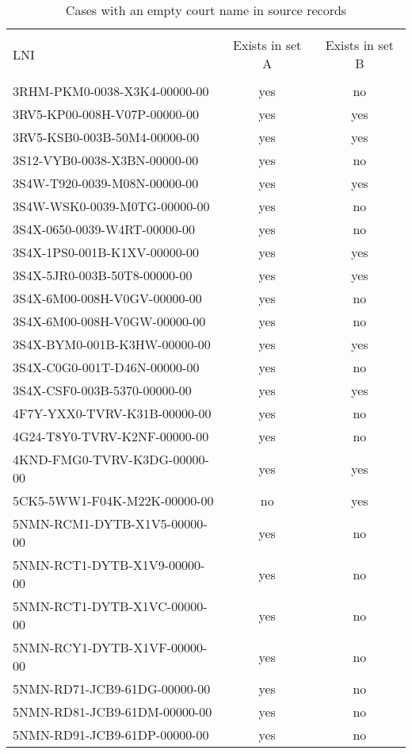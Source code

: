 \documentclass[10pt, letterpaper]{article}
\begin{document}
\begin{spacing}{1.0}
\begin{table}[H]
    \centering
    \caption{Cases with an empty court name in source records}
    \begin{tabular}{p{2.5in}cc}
        \hline\\[-6pt]
        LNI & Exists in set A & Exists in set B\\[4pt]
        \hline\\[-6pt]
        3RHM-PKM0-0038-X3K4-00000-00 & yes & no\\
        3RV5-KP00-008H-V07P-00000-00 & yes & yes\\
        3RV5-KSB0-003B-50M4-00000-00 & yes & yes\\
        3S12-VYB0-0038-X3BN-00000-00 & yes & no\\
        3S4W-T920-0039-M08N-00000-00 & yes & yes\\
        3S4W-WSK0-0039-M0TG-00000-00 & yes & no\\
        3S4X-0650-0039-W4RT-00000-00 & yes & no\\
        3S4X-1PS0-001B-K1XV-00000-00 & yes & yes\\
        3S4X-5JR0-003B-50T8-00000-00 & yes & yes\\
        3S4X-6M00-008H-V0GV-00000-00 & yes & no\\
        3S4X-6M00-008H-V0GW-00000-00 & yes & no\\
        3S4X-BYM0-001B-K3HW-00000-00 & yes & yes\\
        3S4X-C0G0-001T-D46N-00000-00 & yes & no\\
        3S4X-CSF0-003B-5370-00000-00 & yes & yes\\
        4F7Y-YXX0-TVRV-K31B-00000-00 & yes & no\\
        4G24-T8Y0-TVRV-K2NF-00000-00 & yes & no\\
        4KND-FMG0-TVRV-K3DG-00000-00 & yes & yes\\
        5CK5-5WW1-F04K-M22K-00000-00 & no & yes\\
        5NMN-RCM1-DYTB-X1V5-00000-00 & yes & no\\
        5NMN-RCT1-DYTB-X1V9-00000-00 & yes & no\\
        5NMN-RCT1-DYTB-X1VC-00000-00 & yes & no\\
        5NMN-RCY1-DYTB-X1VF-00000-00 & yes & no\\
        5NMN-RD71-JCB9-61DG-00000-00 & yes & no\\
        5NMN-RD81-JCB9-61DM-00000-00 & yes & no\\
        5NMN-RD91-JCB9-61DP-00000-00 & yes & no\\

\end{tabular}
\end{table}
\end{spacing}
\end{document}
